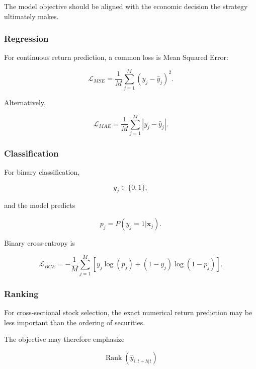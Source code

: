 \documentclass[11pt,a4paper]{article}
\begin{document}
The model objective should be aligned with the economic decision the strategy
ultimately makes.


\subsubsection{Regression}

For continuous return prediction, a common loss is Mean Squared Error:

\begin{equation}
\boxed{
\mathcal{L}_{MSE}
=
\frac{1}{M}
\sum_{j=1}^{M}
\left(
y_j-\widehat{y}_j
\right)^2.
}
\end{equation}

Alternatively,

\begin{equation}
\mathcal{L}_{MAE}
=
\frac{1}{M}
\sum_{j=1}^{M}
|y_j-\widehat{y}_j|.
\end{equation}


\subsubsection{Classification}

For binary classification,

\begin{equation}
y_j\in\{0,1\},
\end{equation}

and the model predicts

\begin{equation}
p_j
=
P(y_j=1|\mathbf{x}_j).
\end{equation}

Binary cross-entropy is

\begin{equation}
\boxed{
\mathcal{L}_{BCE}
=
-
\frac{1}{M}
\sum_{j=1}^{M}
\left[
y_j\log(p_j)
+
(1-y_j)\log(1-p_j)
\right].
}
\end{equation}


\subsubsection{Ranking}

For cross-sectional stock selection, the exact numerical return prediction may
be less important than the ordering of securities.

The objective may therefore emphasize

\begin{equation}
\operatorname{Rank}
\left(
\widehat{y}_{i,t+h|t}
\right)
\end{equation}
\end{document}
